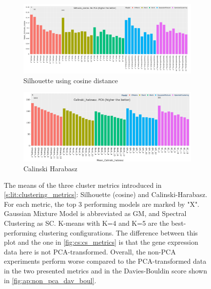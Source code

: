 \begin{figure}[H]
    \centering
    \begin{subfigure}[!t]{1.0\textwidth}
        \includegraphics[width=\textwidth,keepaspectratio]{Sections/ClusteringAnalysis/Resources/cs_top3/non_PCA_top3_Silhoute_cosine.png}
        \caption{Silhouette using cosine distance}
        \label{fig:ap:cosine}
    \end{subfigure}
    \centering
    \begin{subfigure}[!t]{1.0\textwidth}
        \includegraphics[width=\textwidth,keepaspectratio]{Sections/ClusteringAnalysis/Resources/cs_top3/PCA_top3_Calinski_habrasz.png}
        \caption{Calinski Harabasz}
        \label{fig:ap:cal_hab}
    \end{subfigure}
    \caption{The means of the three cluster metrics introduced in \cref{s:lit:clustering_metrics}: Silhouette (cosine) and Calinski-Harabasz. For each metric, the top 3 performing models are marked by "X". Gaussian Mixture Model is abbreviated as GM, and Spectral Clustering as SC. K-means with K=4 and K=5 are the best-performing clustering configurations. The difference between this plot and the one in \cref{fig:cs:cs_metrics} is that the gene expression data here is not PCA-transformed. Overall, the non-PCA experiments perform worse compared to the PCA-transformed data in the two presented metrics and in the Davies-Bouldin score shown in \cref{fig:ap:non_pca_dav_boul}.}
    \label{fig:ap:non_pca_metrics}
\end{figure}

